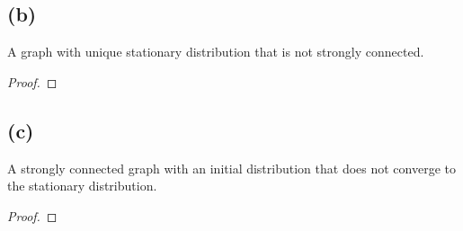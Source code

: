 \documentclass[14pt]{extarticle}
\begin{document}
\subsection{(b)}
A graph with unique stationary distribution that is not strongly connected.
\begin{proof}
\end{proof}

\subsection{(c)}
A strongly connected graph with an initial distribution that does not converge to the stationary distribu­tion.
\begin{proof}
\end{proof}
\end{document}
